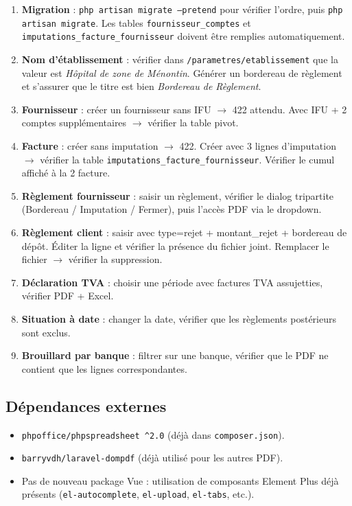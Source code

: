 \documentclass[11pt,a4paper]{article}
\begin{document}
\begin{enumerate}[leftmargin=1.4em]
  \item \textbf{Migration} : \texttt{php artisan migrate --pretend} pour vérifier
    l'ordre, puis \texttt{php artisan migrate}. Les tables
    \texttt{fournisseur\_comptes} et \texttt{imputations\_facture\_fournisseur}
    doivent être remplies automatiquement.
  \item \textbf{Nom d'établissement} : vérifier dans
    \texttt{/parametres/etablissement} que la valeur est \emph{Hôpital de
    zone de Ménontin}. Générer un bordereau de règlement et s'assurer que
    le titre est bien \emph{Bordereau de Règlement}.
  \item \textbf{Fournisseur} : créer un fournisseur sans IFU \(\rightarrow\) 422 attendu.
    Avec IFU + 2 comptes supplémentaires \(\rightarrow\) vérifier la table pivot.
  \item \textbf{Facture} : créer sans imputation \(\rightarrow\) 422. Créer avec 3 lignes
    d'imputation \(\rightarrow\) vérifier la table \texttt{imputations\_facture\_fournisseur}.
    Vérifier le cumul affiché à la 2 facture.
  \item \textbf{Règlement fournisseur} : saisir un règlement, vérifier le
    dialog tripartite (Bordereau / Imputation / Fermer), puis l'accès
    PDF via le dropdown.
  \item \textbf{Règlement client} : saisir avec type=rejet + montant\_rejet
    + bordereau de dépôt. Éditer la ligne et vérifier la présence du
    fichier joint. Remplacer le fichier \(\rightarrow\) vérifier la suppression.
  \item \textbf{Déclaration TVA} : choisir une période avec factures TVA
    assujetties, vérifier PDF + Excel.
  \item \textbf{Situation à date} : changer la date, vérifier que les
    règlements postérieurs sont exclus.
  \item \textbf{Brouillard par banque} : filtrer sur une banque, vérifier
    que le PDF ne contient que les lignes correspondantes.
\end{enumerate}

\subsection{Dépendances externes}

\begin{itemize}[leftmargin=1.4em]
  \item \texttt{phpoffice/phpspreadsheet \^{}2.0} (déjà dans \texttt{composer.json}).
  \item \texttt{barryvdh/laravel-dompdf} (déjà utilisé pour les autres PDF).
  \item Pas de nouveau package Vue : utilisation de composants Element Plus
    déjà présents (\texttt{el-autocomplete}, \texttt{el-upload},
    \texttt{el-tabs}, etc.).
\end{itemize}
\end{document}
